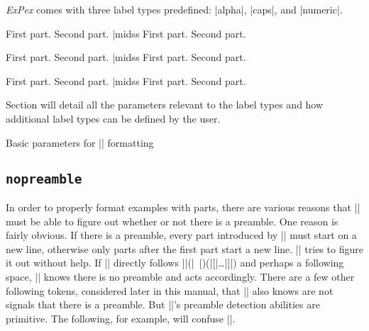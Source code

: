 {\sl ExPex\/} comes with three label types predefined: |alpha|,
|caps|, and |numeric|.

\beginss
\pex[labeltype=alpha]
\a First part.
\a Second part.
\xe |midss
\pex[labeltype=alpha]
\a First part.
\a Second part.
\xe
\endss

\beginss
\pex[labeltype=caps]
\a First part.
\a Second part.
\xe |midss
\pex[labeltype=caps]
\a First part.
\a Second part.
\xe
\endss

\beginss
\pex[labeltype=numeric]
\a First part.
\a Second part.
\xe |midss
\pex[labeltype=numeric]
\a First part.
\a Second part.
\xe
\endss

Section  will detail all the parameters relevant
to the label types and how additional label types can be defined
by the user.

\ex Basic parameters for |\pex| formatting\smallskip
\leftskip=0pt
\hfil{}\xe

\subsection {\tt nopreamble}

In order to properly format examples with parts, there are
various reasons that |\pex| must be able to figure out whether
or not there is a preamble.  One reason is fairly obvious.  If
there is a preamble, every part introduced by |\a| must start on
a new line, otherwise only parts after the first part start a new
line.  |\pex| tries to figure it out without help.  If |\a|
directly follows |\pex|(|~|)(|[|\dots|]|) and perhaps a following
space, |\pex| knows there is no preamble and acts accordingly.
There are a few other following tokens, considered later in this
manual, that |\pex| also knows are not signals that there is a
preamble.  But |\pex|'s preamble detection abilities are
primitive.  The following, for example, will confuse |\pex|.

